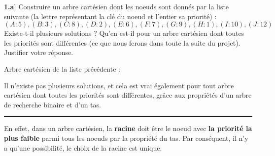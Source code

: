 \documentclass[a4paper,12pt]{report}
\begin{document}
\textbf{1.a]} Construire un arbre cartésien dont les noeuds sont donnés par la liste suivante (la lettre représentant la clé du noeud et l'entier sa priorité) :
\[
(A:5), (B:3), (C:8), (D:2), (E:6), (F:7), (G:9), (H:1), (I:10), (J:12)
\]
Existe-t-il plusieurs solutions ? Qu'en est-il pour un arbre cartésien dont toutes les priorités sont différentes (ce que nous ferons dans toute la suite du projet). Justifier votre réponse.\\



\begin{tcolorbox}[colback=gray!10, colframe=blue!30, coltitle=black, title=Réponse à la 1.a - 1/2]
    Arbre cartésien de la liste précédente :\\

    \begin{center}
    \end{center}

    Il n'existe pas plusieurs solutions, et cela est vrai également pour tout arbre cartésien dont toutes les priorités sont différentes, grâce aux propriétés d'un arbre de recherche binaire et d'un tas.

    \vspace{0.5cm}
    \hrule
    \vspace{0.5cm}

    En effet, dans un arbre cartésien, la \textbf{racine} doit être le noeud avec \textbf{la priorité la plus faible} parmi tous les noeuds par la propriété du tas. Par conséquent, il n'y a qu'une possibilité, le choix de la racine est unique.

\end{tcolorbox}
\end{document}
